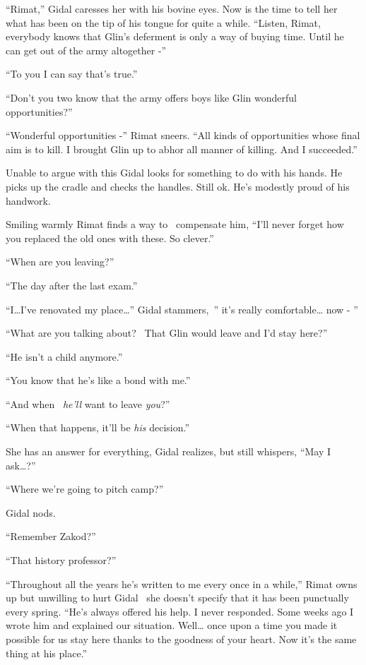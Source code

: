 \documentclass[twoside,11pt]{book}
\begin{document}
``Rimat,'' Gidal caresses her with his bovine eyes. Now is the time to tell her what has been
on the tip of his tongue for quite{ }a while. ``Listen, Rimat, everybody knows that Glin's
deferment is only a way of buying time. Until he can get out of the army altogether -''

``To you I can say that's true.''

``Don't you two know that the army offers boys like Glin wonderful opportunities?''

``Wonderful opportunities -'' Rimat sneers. ``All kinds of opportunities whose
final aim is to kill. I brought Glin up to abhor all manner of killing. And I succeeded.''

Unable to argue with this Gidal looks for something to do with his hands. He picks up the cradle and checks the handles.
Still ok. He's modestly proud of his handwork.

Smiling warmly Rimat finds a way to \ compensate him, ``I'll never forget how you replaced the old ones
with these. So clever.''

``When are you leaving?''

``The day after the last exam.''

``I{\dots}I've renovated my place{\dots}'' Gidal stammers,~'' it's really
comfortable{\dots} now - ''

``What are you talking about? \ That Glin would leave and I'd stay here?''

``He isn't a child anymore.''

``You know that he's like a bond{ }with me.''

``And when {\ }\textit{he'll} want to leave \textit{you}?''

``When that happens, it'll be \textit{his} decision.''

She has an answer for everything, Gidal realizes, but still whispers, ``May I ask{\dots}?''

``Where we're going to pitch camp?''

Gidal nods.

``Remember Zakod?''

``That history professor?''

``Throughout all the years he's written to me every once in a while,'' Rimat owns up but
unwilling to hurt Gidal \ she doesn't specify that it has been{
}{punctually}{ }every spring. ``He's always offered his help. I never
responded. Some weeks ago I wrote him and explained our situation. Well{\dots} once upon a time you made it possible
for us stay here thanks to{ }the goodness of your heart. Now it's the same thing at his
place.''
\end{document}
